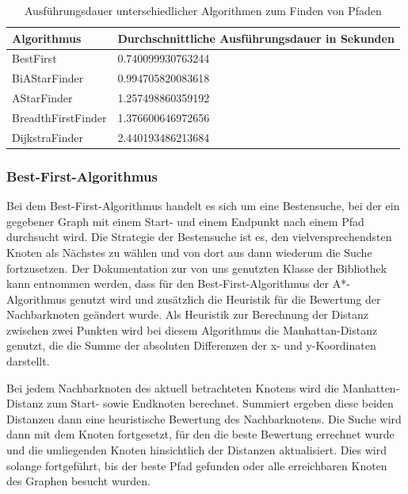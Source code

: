 \begin{table}[htb]
    \centering
    \begin{tabular}{|l|l|}
        \hline
            \textbf{Algorithmus} & {\textbf{Durchschnittliche Ausführungsdauer in Sekunden}} \\ \hline
            BestFirst 		    & 0.740099930763244 \\ \hline
            BiAStarFinder 		& 0.994705820083618 \\ \hline
            AStarFinder 		& 1.257498860359192 \\ \hline
            BreadthFirstFinder  & 1.376600646972656 \\ \hline
            DijkstraFinder		& 2.440193486213684 \\ \hline
    \end{tabular}
    \caption{Ausführungsdauer unterschiedlicher Algorithmen zum Finden von Pfaden}
    \label{tab:ausfuehrungsdauer-pfadalgorithmen}
\end{table}

\subsubsection*{Best-First-Algorithmus}
\label{subsubsec:best-first-algorithm}

Bei dem Best-First-Algorithmus handelt es sich um eine Bestensuche, bei der ein gegebener Graph mit einem Start- und
einem Endpunkt nach einem Pfad durchsucht wird.
Die Strategie der Bestensuche ist es, den vielversprechendsten Knoten als Nächstes zu wählen und von dort aus dann
wiederum die Suche fortzusetzen.
Der Dokumentation zur von uns genutzten Klasse  der Bibliothek  kann entnommen werden,
dass für den Best-First-Algorithmus der A*-Algorithmus genutzt wird und zusätzlich die Heuristik für die Bewertung der
Nachbarknoten geändert wurde.
Als Heuristik zur Berechnung der Distanz zwischen zwei Punkten wird bei diesem Algorithmus die Manhattan-Distanz
genutzt, die die Summe der absoluten Differenzen der x- und y-Koordinaten darstellt. 

Bei jedem Nachbarknoten des aktuell betrachteten Knotens wird die Manhatten-Distanz zum Start- sowie Endknoten
berechnet.
Summiert ergeben diese beiden Distanzen dann eine heuristische Bewertung des Nachbarknotens.
Die Suche wird dann mit dem Knoten fortgesetzt, für den die beste Bewertung errechnet wurde und die umliegenden Knoten
hinsichtlich der Distanzen aktualisiert.
Dies wird solange fortgeführt, bis der beste Pfad gefunden oder alle erreichbaren Knoten des Graphen besucht wurden.

